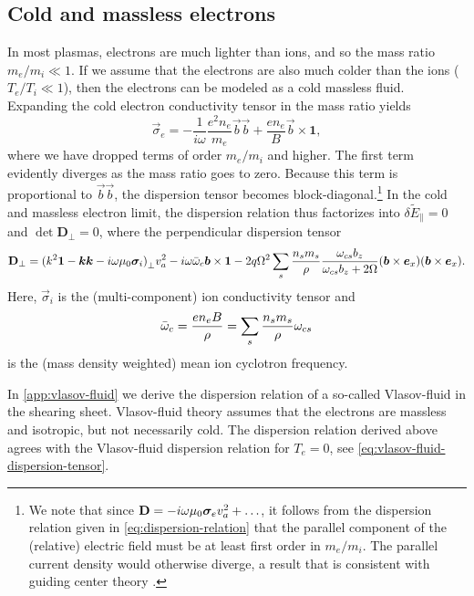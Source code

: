 \documentclass[aps,pre,notitlepage,amsmath,amssymb,amsfonts,nobibnotes,nofootinbib]{revtex4-1}
\begin{document}
\subsection{Cold and massless electrons}
\label{sec:cold-e}

In most plasmas, electrons are much lighter than ions, and so the mass ratio
$m_e/m_i\ll1$. If we assume that the electrons are also much colder than the
ions ($T_e/T_i\ll1$), then the electrons can be modeled as a cold massless
fluid. Expanding the cold electron conductivity tensor in the mass ratio
yields
\begin{equation}
  \label{eq:cold-electron-conductivity}
  \vec{\sigma}_e = -\frac{1}{i\omega}\frac{e^2n_e}{m_e}\vec{b}\vec{b}
  + \frac{en_e}{B}\vec{b}\times\mathbf{1},
\end{equation}
where we have dropped terms of order $m_e/m_i$ and higher. The first term
evidently diverges as the mass ratio goes to zero. Because this term is
proportional to $\vec{b}\vec{b}$, the dispersion tensor becomes
block-diagonal.\footnote{We note that since
  $\mathbf{D}=-i\omega\mu_0\bm{\sigma}_ev_a^2+\ldots$, it follows from the
  dispersion relation given in \cref{eq:dispersion-relation} that the parallel
  component of the (relative) electric field must be at least first order in
  $m_e/m_i$. The parallel current density would otherwise diverge, a result
  that is consistent with guiding center theory \citep[e.g.][]{Grad1961}.} In
the cold and massless electron limit, the dispersion relation thus factorizes
into $\delta{}\tilde{E}_\parallel=0$ and $\det\mathbf{D}_\perp=0$, where the
perpendicular dispersion tensor
\begin{equation}
  \label{eq:perpendicular-dispersion}
  \mathbf{D}_\perp =
  {(k^2\mathbf{1} - \vec{k}\vec{k} - i\omega\mu_0\vec{\sigma}_i)}_\perp\va^2
  - i\omega\ome\vec{b}\times\mathbf{1}
  - 2q\Omega^2\sums\frac{n_s{}m_s}{\rho}\frac{\omcs b_z}{\omcs b_z + 2\Omega}
  (\vec{b}\times\ex)(\vec{b}\times\ex).
\end{equation}
Here, $\vec{\sigma}_i$ is the (multi-component) ion conductivity tensor and
\begin{equation}
  \bar{\omega}_c = \frac{en_e B}{\rho} = \sum_s\frac{n_s m_s}{\rho}\omega_{cs}
\end{equation}
is the (mass density weighted) mean ion cyclotron frequency.

In \cref{app:vlasov-fluid} we derive the dispersion relation of a so-called
Vlasov-fluid in the shearing sheet. Vlasov-fluid theory \citep{Freidberg1972}
assumes that the electrons are massless and isotropic, but not necessarily
cold. The dispersion relation derived above agrees with the Vlasov-fluid
dispersion relation for $T_e=0$, see \cref{eq:vlasov-fluid-dispersion-tensor}.
\end{document}
